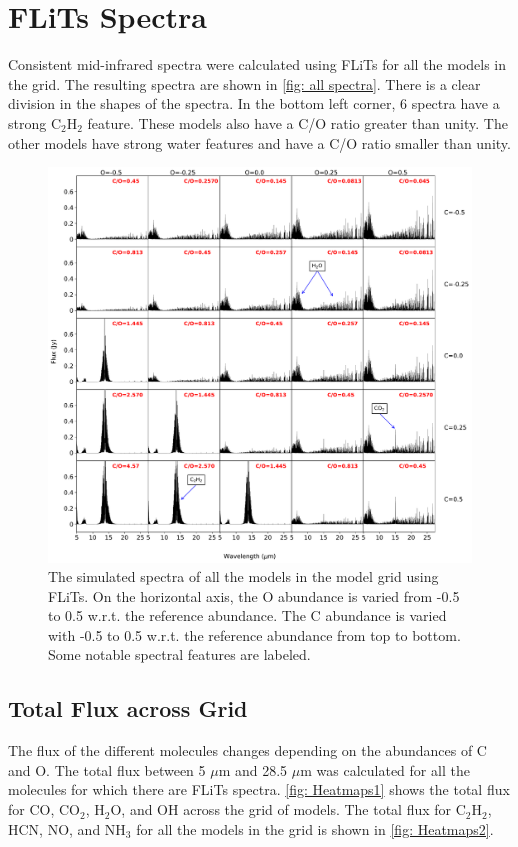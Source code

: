 \documentclass[twoside, single, authoryear, semicolon, 12pt]{lion-msc}
\newcommand{\4}{$_4$}
\newcommand{\3}{$_3$}
\newcommand{\2}{$_2$}
\begin{document}
\section{FLiTs Spectra}
Consistent mid-infrared spectra were calculated using FLiTs for all the models in the grid. The resulting spectra are shown in \autoref{fig: all spectra}. There is a clear division in the shapes of the spectra. In the bottom left corner, 6 spectra have a strong C\2H\2 feature. These models also have a C/O ratio greater than unity. The other models have strong water features and have a C/O ratio smaller than unity. 

\begin{figure}[H]
    \centering
    \includegraphics[width=\linewidth]{Figures/All_spectra.pdf}
    \caption{The simulated spectra of all the models in the model grid using FLiTs. On the horizontal axis, the O abundance is varied from -0.5 to 0.5 w.r.t. the reference abundance. The C abundance is varied with -0.5 to 0.5 w.r.t. the reference abundance from top to bottom. Some notable spectral features are labeled.}
    \label{fig: all spectra}
\end{figure}
\subsection{Total Flux across Grid}
The flux of the different molecules changes depending on the abundances of C and O. The total flux between 5 $\mu$m and 28.5 $\mu$m was calculated for all the molecules for which there are FLiTs spectra. \autoref{fig: Heatmaps1} shows the total flux for CO, CO\2, H\2O, and OH across the grid of models. The total flux for C\2H\2, HCN, NO, and NH\3 for all the models in the grid is shown in \autoref{fig: Heatmaps2}. 
\end{document}
